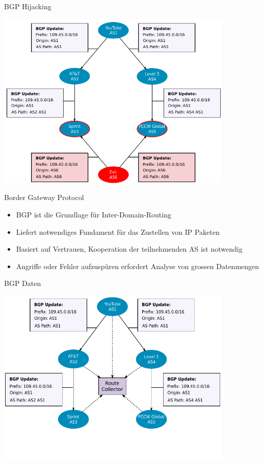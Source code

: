 \documentclass[9pt]{beamer}
\begin{document}
\begin{frame}{BGP Hijacking}{}
	\begin{center}
		\includegraphics[width=0.85\textwidth]{res/prefix_hijack.pdf}
	\end{center}
\end{frame}
\begin{frame}{Border Gateway Protocol}
    \begin{itemize}
        \pause
        \item{BGP ist die Grundlage für Inter-Domain-Routing}
        \pause
        \item{Liefert notwendiges Fundament für das Zustellen von IP Paketen}
        \pause
        \item{Basiert auf Vertrauen, Kooperation der teilnehmenden AS ist notwendig}
        \pause
        \item{Angriffe oder Fehler aufzuspüren erfordert Analyse von grossen Datenmengen}
    \end{itemize}
\end{frame}
\begin{frame}{BGP Daten}{}
	\begin{center}
		\includegraphics[width=0.85\textwidth]{res/route_collector.pdf}
	\end{center}
\end{frame}
\end{document}
